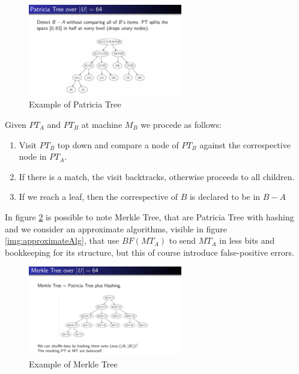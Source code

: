 \begin{figure}
	\includegraphics[width=0.6\textwidth]{Images/patricia}
	\caption {Example of Patricia Tree}
	\label{img:patricia}
\end{figure}
Given $PT_A$ and $PT_B$ at machine $M_B$ we procede as follows:
\begin{enumerate}
    \item Visit $PT_B$ top down and compare a node of $PT_B$ against the correspective node in $PT_A$.
    \item If there is a match, the visit backtracks, otherwise proceeds to all children.
    \item If we reach a leaf, then the correspective of $B$ is declared to be in $B - A$
\end{enumerate}
In figure \ref{img:merkleTree} is possible to note Merkle Tree, that are Patricia Tree with hashing and we consider an approximate algorithms, visible in figure \ref{img:approximateAlg},
that use $BF(MT_A)$ to send $MT_A$ in less bits and bookkeeping for its structure, but this of course introduce false-positive errors.
\begin{figure}
	\includegraphics[width=0.6\textwidth]{Images/merkle}
	\caption{Example of Merkle Tree}
	\label{img:merkleTree}
\end{figure}

